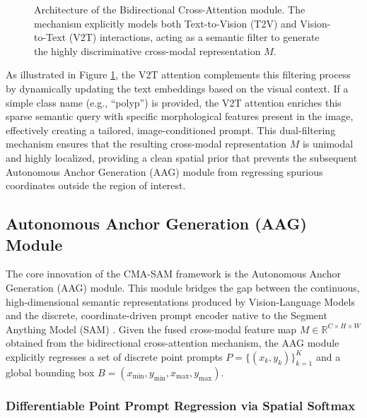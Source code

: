 \documentclass[onecolumn]{IEEEtran}
\numberwithin{equation}{section}
\theoremstyle{definition}
\theoremstyle{remark}
\begin{document}
\begin{figure}[!htbp]
{%
}
\caption{Architecture of the Bidirectional Cross-Attention module. The mechanism explicitly models both Text-to-Vision (T2V) and Vision-to-Text (V2T) interactions, acting as a semantic filter to generate the highly discriminative cross-modal representation $M$.}
\label{fig:cross_attention}
\end{figure}

As illustrated in Figure \ref{fig:cross_attention}, the V2T attention complements this filtering process by dynamically updating the text embeddings based on the visual context. If a simple class name (e.g., ``polyp'') is provided, the V2T attention enriches this sparse semantic query with specific morphological features present in the image, effectively creating a tailored, image-conditioned prompt. This dual-filtering mechanism ensures that the resulting cross-modal representation $M$ is unimodal and highly localized, providing a clean spatial prior that prevents the subsequent Autonomous Anchor Generation (AAG) module from regressing spurious coordinates outside the region of interest.

\subsection{Autonomous Anchor Generation (AAG) Module}

The core innovation of the CMA-SAM framework is the Autonomous Anchor Generation (AAG) module. This module bridges the gap between the continuous, high-dimensional semantic representations produced by Vision-Language Models and the discrete, coordinate-driven prompt encoder native to the Segment Anything Model (SAM) \cite{kirillov2023segment}. Given the fused cross-modal feature map $M \in \mathbb{R}^{C \times H \times W}$ obtained from the bidirectional cross-attention mechanism, the AAG module explicitly regresses a set of discrete point prompts $P = \{(x_k, y_k)\}_{k=1}^K$ and a global bounding box $B = (x_{\min}, y_{\min}, x_{\max}, y_{\max})$.

\subsubsection{Differentiable Point Prompt Regression via Spatial Softmax}
\end{document}
